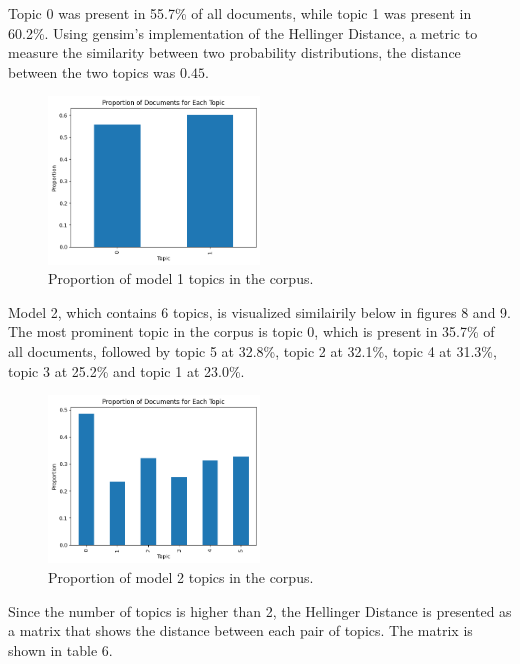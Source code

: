 Topic 0 was present in 55.7\% of all documents, while topic 1 was present in 60.2\%. Using gensim's implementation of the Hellinger Distance, a metric to measure the similarity between two probability distributions, the distance between the two topics was $0.45$.

\begin{figure}[H]
    \centering
    \includegraphics[width=0.5\textwidth]{resources/proportion_n_2.png}
    \caption{Proportion of model 1 topics in the corpus.}
    \label{fig:proportion_n_2}
\end{figure}

Model 2, which contains 6 topics, is visualized similairily below in figures 8 and 9. The most prominent topic in the corpus is topic 0, which is present in 35.7\% of all documents, followed by topic 5 at 32.8\%, topic 2 at 32.1\%, topic 4 at 31.3\%, topic 3 at 25.2\% and topic 1 at 23.0\%.

\begin{figure}[H]
    \centering
    \includegraphics[width=0.5\textwidth]{resources/proportion_n_6.png}
    \caption{Proportion of model 2 topics in the corpus.}
    \label{fig:proportion_n_6}
\end{figure}

Since the number of topics is higher than 2, the Hellinger Distance is presented as a matrix that shows the distance between each pair of topics. The matrix is shown in table 6.

